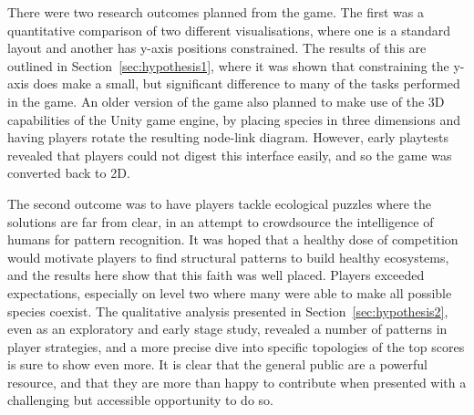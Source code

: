 There were two research outcomes planned from the game. The first was a quantitative comparison of two different visualisations, where one is a standard layout and another has y-axis positions constrained.  The results of this are outlined in Section~\ref{sec:hypothesis1}, where it was shown that constraining the y-axis does make a small, but significant difference to many of the tasks performed in the game.
An older version of the game also planned to make use of the 3D capabilities of the Unity game engine, by placing species in three dimensions and having players rotate the resulting node-link diagram. However, early playtests revealed that players could not digest this interface easily, and so the game was converted back to 2D.

The second outcome was to have players tackle ecological puzzles where the solutions are far from clear, in an attempt to crowdsource the intelligence of humans for pattern recognition. It was hoped that a healthy dose of competition would motivate players to find structural patterns to build healthy ecosystems, and the results here show that this faith was well placed. Players exceeded expectations, especially on level two where many were able to make all possible species coexist.
The qualitative analysis presented in Section~\ref{sec:hypothesis2}, even as an exploratory and early stage study, revealed a number of patterns in player strategies, and a more precise dive into specific topologies of the top scores is sure to show even more.
It is clear that the general public are a powerful resource, and that they are more than happy to contribute when presented with a challenging but accessible opportunity to do so.



